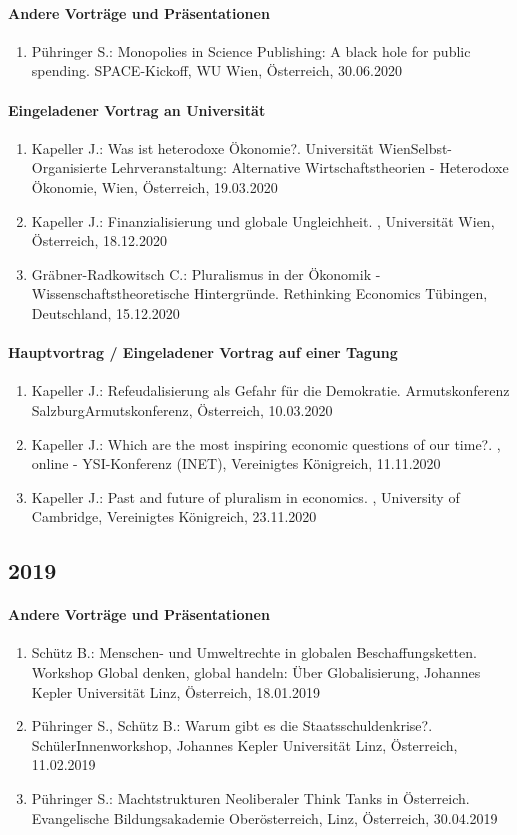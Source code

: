 \paragraph{Andere Vorträge und Präsentationen}
\begin{enumerate}
	\item Pühringer S.: Monopolies in Science Publishing: A black hole for public spending. SPACE-Kickoff, WU Wien, Österreich, 30.06.2020
\end{enumerate}
\paragraph{Eingeladener Vortrag an Universität}
\begin{enumerate}
	\item Kapeller J.: Was ist heterodoxe Ökonomie?. Universität WienSelbst-Organisierte Lehrveranstaltung: \glqq Alternative Wirtschaftstheorien - Heterodoxe Ökonomie\grqq{}, Wien, Österreich, 19.03.2020
	\item Kapeller J.: Finanzialisierung und globale Ungleichheit. , Universität Wien, Österreich, 18.12.2020
	\item Gräbner-Radkowitsch C.: Pluralismus in der Ökonomik - Wissenschaftstheoretische Hintergründe. Rethinking Economics Tübingen, Deutschland, 15.12.2020
\end{enumerate}
\paragraph{Hauptvortrag / Eingeladener Vortrag auf einer Tagung}
\begin{enumerate}
	\item Kapeller J.: Refeudalisierung als Gefahr für die Demokratie. Armutskonferenz SalzburgArmutskonferenz, Österreich, 10.03.2020
	\item Kapeller J.: Which are the most inspiring economic questions of our time?. , online - YSI-Konferenz (INET), Vereinigtes Königreich, 11.11.2020
	\item Kapeller J.: Past and future of pluralism in economics. , University of Cambridge, Vereinigtes Königreich, 23.11.2020
\end{enumerate}
\subsection*{2019}
\paragraph{Andere Vorträge und Präsentationen}
\begin{enumerate}
	\item Schütz B.: Menschen- und Umweltrechte in globalen Beschaffungsketten. Workshop Global denken, global handeln: Über Globalisierung, Johannes Kepler Universität Linz, Österreich, 18.01.2019
	\item Pühringer S., Schütz B.: Warum gibt es die Staatsschuldenkrise?. SchülerInnenworkshop, Johannes Kepler Universität Linz, Österreich, 11.02.2019
	\item Pühringer S.: Machtstrukturen Neoliberaler Think Tanks in Österreich. Evangelische Bildungsakademie Oberösterreich, Linz, Österreich, 30.04.2019
\end{enumerate}

